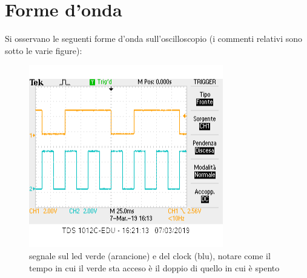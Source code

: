 \documentclass[12pt,a4paper]{article}
\begin{document}
\newpage



\section{Forme d'onda}
Si osservano le seguenti forme d'onda sull'oscilloscopio (i commenti relativi sono sotto le varie figure):
\begin{figure}\centering
	\includegraphics[scale=0.9]{green.png}
	\caption{ segnale sul led verde (arancione) e del clock (blu), notare come il tempo in cui il verde sta acceso è il doppio di quello in cui è spento}
	
\end{figure}
\end{document}
